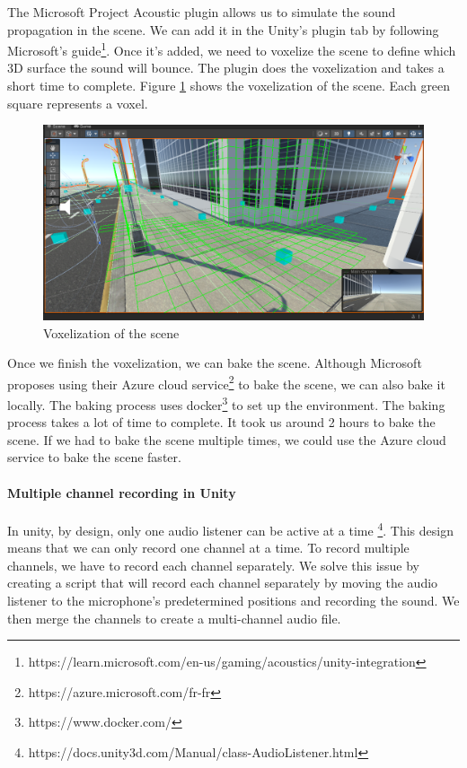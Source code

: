 The Microsoft Project Acoustic plugin allows us to simulate the sound propagation in the scene. We can add it in the Unity's plugin tab by following Microsoft's guide\footnote{https://learn.microsoft.com/en-us/gaming/acoustics/unity-integration}. Once it's added, we need to voxelize the scene to define which 3D surface the sound will bounce. The plugin does the voxelization and takes a short time to complete. Figure \ref{fig:simulation_voxelization} shows the voxelization of the scene. Each green square represents a voxel.

\begin{figure}[H]
    \centering
    \includegraphics[width=.8\textwidth]{images/simulation_voxelization.png}
    \caption{Voxelization of the scene}
    \label{fig:simulation_voxelization}
\end{figure}

Once we finish the voxelization, we can bake the scene. Although Microsoft proposes using their Azure cloud service\footnote{https://azure.microsoft.com/fr-fr} to bake the scene, we can also bake it locally. The baking process uses docker\footnote{https://www.docker.com/} to set up the environment. The baking process takes a lot of time to complete. It took us around 2 hours to bake the scene. If we had to bake the scene multiple times, we could use the Azure cloud service to bake the scene faster.

\paragraph{Multiple channel recording in Unity}

In unity, by design, only one audio listener can be active at a time \footnote{https://docs.unity3d.com/Manual/class-AudioListener.html}. This design means that we can only record one channel at a time. To record multiple channels, we have to record each channel separately. We solve this issue by creating a script that will record each channel separately by moving the audio listener to the microphone's predetermined positions and recording the sound. We then merge the channels to create a multi-channel audio file.

